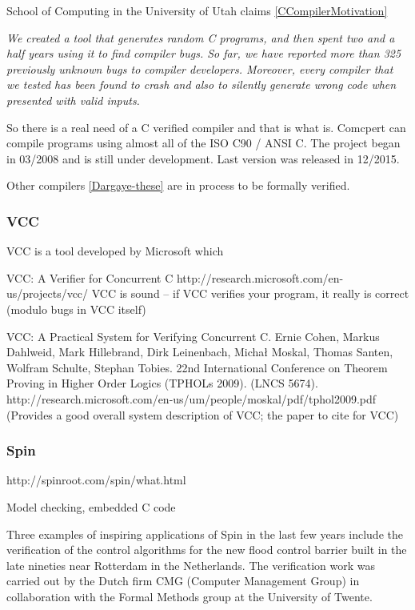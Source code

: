 School of Computing in the University of Utah claims \ref{CCompilerMotivation}

\textit{We created a tool that generates random C programs, and then spent two and a half years using it to find compiler bugs. So far, we have reported more than 325 previously unknown bugs to compiler developers. Moreover, every compiler that we tested has been found to crash and also to silently generate wrong code when presented with valid inputs.}

So there is a real need of a C verified compiler and that is what  is. 
%
Comcpert can compile programs using almost all of the ISO C90 / ANSI C. The project began in 03/2008 and is still under development. Last version was released in 12/2015.

Other compilers \ref{Dargaye-these} are in process to be formally verified.


\subsubsection{VCC}

\gls{VCC} is a tool developed by Microsoft which

VCC: A Verifier for Concurrent C  http://research.microsoft.com/en-us/projects/vcc/
VCC is sound -- if VCC verifies your program, it really is correct (modulo bugs in VCC itself)

VCC: A Practical System for Verifying Concurrent C. Ernie Cohen, Markus Dahlweid, Mark Hillebrand, Dirk Leinenbach, Michał Moskal, Thomas Santen, Wolfram Schulte, Stephan Tobies. 22nd International Conference on Theorem Proving in Higher Order Logics (TPHOLs 2009). (LNCS 5674). http://research.microsoft.com/en-us/um/people/moskal/pdf/tphol2009.pdf (Provides a good overall system description of VCC; the paper to cite for VCC)


\subsubsection{Spin}

http://spinroot.com/spin/what.html

Model checking, embedded C code

Three examples of inspiring applications of Spin in the last few years include the verification of the control algorithms for the new flood control barrier built in the late nineties near Rotterdam in the Netherlands. The verification work was carried out by the Dutch firm CMG (Computer Management Group) in collaboration with the Formal Methods group at the University of Twente.


